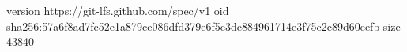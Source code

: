 version https://git-lfs.github.com/spec/v1
oid sha256:57a6f8ad7fc52e1a879ce086dfd379e6f5c3dc884961714e3f75c2c89d60eefb
size 43840
